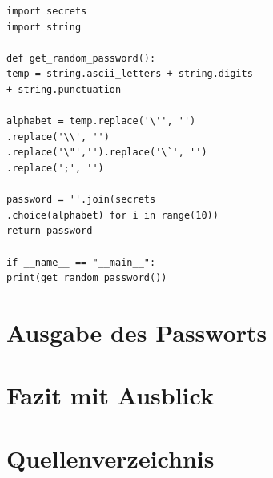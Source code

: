 \documentclass[a4paper,11pt,singlespacing]{article}
\begin{document}
    	
    	
\begin{lstlisting}
import secrets
import string

def get_random_password():
temp = string.ascii_letters + string.digits 
+ string.punctuation

alphabet = temp.replace('\'', '')
.replace('\\', '')
.replace('\"','').replace('\`', '')
.replace(';', '')

password = ''.join(secrets
.choice(alphabet) for i in range(10))
return password

if __name__ == "__main__":
print(get_random_password())
\end{lstlisting}
    	
    	\section{Ausgabe des Passworts}
    	
    	
    	
    	\section{Fazit mit Ausblick}
    	
    	\section{Quellenverzeichnis}
        
        
    	
\end{document}
